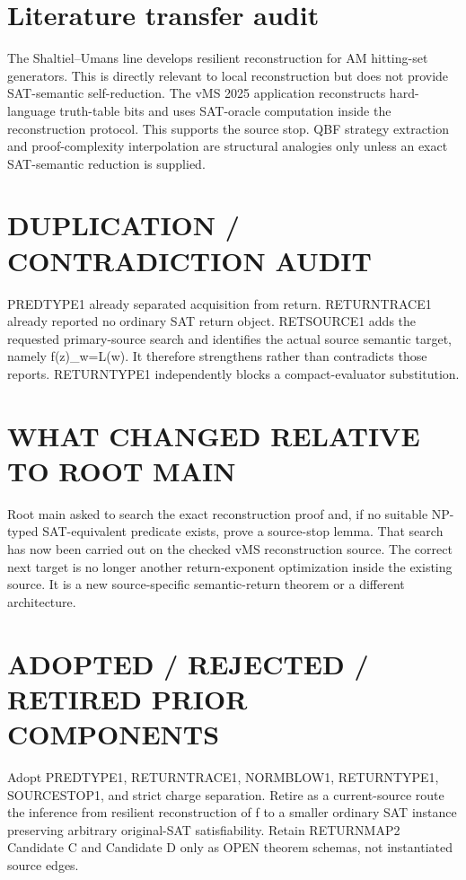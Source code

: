 \documentclass[11pt]{article}
\begin{document}
\section*{Literature transfer audit}
The Shaltiel--Umans line develops resilient reconstruction for AM hitting-set generators. This is directly relevant to local reconstruction but does not provide SAT-semantic self-reduction. The vMS 2025 application reconstructs hard-language truth-table bits and uses SAT-oracle computation inside the reconstruction protocol. This supports the source stop. QBF strategy extraction and proof-complexity interpolation are structural analogies only unless an exact SAT-semantic reduction is supplied.

\section*{DUPLICATION / CONTRADICTION AUDIT}
PREDTYPE1 already separated acquisition from return. RETURNTRACE1 already reported no ordinary SAT return object. RETSOURCE1 adds the requested primary-source search and identifies the actual source semantic target, namely f(z)_w=L(w). It therefore strengthens rather than contradicts those reports. RETURNTYPE1 independently blocks a compact-evaluator substitution.

\section*{WHAT CHANGED RELATIVE TO ROOT MAIN}
Root main asked to search the exact reconstruction proof and, if no suitable NP-typed SAT-equivalent predicate exists, prove a source-stop lemma. That search has now been carried out on the checked vMS reconstruction source. The correct next target is no longer another return-exponent optimization inside the existing source. It is a new source-specific semantic-return theorem or a different architecture.

\section*{ADOPTED / REJECTED / RETIRED PRIOR COMPONENTS}
Adopt PREDTYPE1, RETURNTRACE1, NORMBLOW1, RETURNTYPE1, SOURCESTOP1, and strict charge separation. Retire as a current-source route the inference from resilient reconstruction of f to a smaller ordinary SAT instance preserving arbitrary original-SAT satisfiability. Retain RETURNMAP2 Candidate C and Candidate D only as OPEN theorem schemas, not instantiated source edges.
\end{document}
